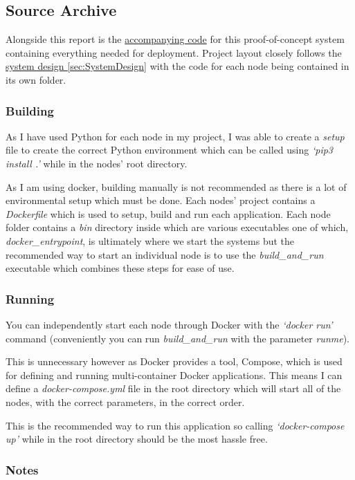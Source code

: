 \documentclass{article}
\begin{document}
    \subsection{Source Archive}
Alongside this report is the \href{https://github.com/Mattie432/Blockchain-Voting-System}{accompanying code} for this proof-of-concept system containing everything needed for deployment. Project layout closely follows the \hyperref[sec:SystemDesign]{system design \ref*{sec:SystemDesign}} with the code for each node being contained in its own folder.

\subsubsection{Building}
As I have used Python for each node in my project, I was able to create a \textit{setup} file to create the correct Python environment which can be called using \textit{`pip3 install .'} while in the nodes' root directory.

As I am using docker, building manually is not recommended as there is a lot of environmental setup which must be done. Each nodes' project contains a \textit{Dockerfile} which is used to setup, build and run each application. Each node folder contains a \textit{bin} directory inside which are various executables one of which, \textit{docker\_entrypoint}, is ultimately where we start the systems but the recommended way to start an individual node is to use the \textit{build\_and\_run} executable which combines these steps for ease of use.

\subsubsection{Running}
You can independently start each node through Docker with the \textit{`docker run'} command (conveniently you can run \textit{build\_and\_run} with the parameter \textit{runme}).

This is unnecessary however as Docker provides a tool, Compose, which is used for defining and running multi-container Docker applications. This means I can define a \textit{docker-compose.yml} file in the root directory which will start all of the nodes, with the correct parameters, in the correct order.

This is the recommended way to run this application so calling \textit{`docker-compose up'} while in the root directory should be the most hassle free.

\subsubsection{Notes}
\end{document}
